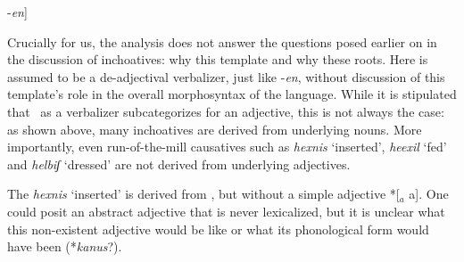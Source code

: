 \begin{exe}
\begin{xlist}
\begin{xlist}
\begin{exe}
\begin{exe}
\begin{xlist}
\begin{exe}
\begin{xlist}
\begin{exe}
\begin{xlist}
\begin{xlist}
\begin{exe}
\begin{xlist}
\begin{exe}
\begin{xlist}
\begin{exe}
\begin{exe}
\begin{exe}
\begin{xlist}
\begin{exe}
\begin{exe}
\begin{xlist}
\begin{xlist}
\begin{exe}
\begin{xlist}
\begin{exe}
\begin{exe}
\begin{exe}
\begin{xlist}
\begin{exe}
\begin{exe}
\begin{xlist}
\begin{exe}
\begin{xlist}
\begin{exe}
\begin{xlist}
\begin{exe}
\begin{xlist}
\begin{exe}
\begin{exe}
\begin{xlist}
\begin{exe}
\begin{exe}
\begin{xlist}
\begin{xlist}
\begin{exe}
\begin{xlist}
\begin{xlist}
\begin{exe}
\begin{xlist}
\begin{exe}
\begin{xlist}
\begin{exe}
\begin{xlist}
\begin{exe}
\begin{xlist}
\begin{exe}
\begin{exe}
\begin{exe}
\begin{exe}
\begin{xlist}
\begin{exe}
\begin{exe}
\begin{xlist}
\begin{xlist}
\begin{exe}
\begin{exe}
\begin{xlist}
\begin{exe}
\begin{xlist}
\begin{exe}
\begin{xlist}
\begin{exe}
\begin{xlist}
\begin{exe}
\begin{xlist}
\begin{exe}
\begin{exe}
 -\emph{en}] 
 \z 

Crucially for us, the analysis does not answer the questions posed earlier on in the discussion of inchoatives: why this template and why these roots. Here {\thif} is assumed to be a de-adjectival verbalizer, just like -\emph{en}, without discussion of this template's role in the overall morphosyntax of the language. While it is stipulated that \thif~as a verbalizer subcategorizes for an adjective, this is not always the case: as shown above, many inchoatives are derived from underlying nouns. More importantly, even run-of-the-mill causatives such as \emph{hexnis} `inserted', \emph{heexil} `fed' and \emph{helbiʃ} `dressed' are not derived from underlying adjectives.

The  \emph{hexnis} `inserted' is derived from , but without a simple adjective *[$_{a}$  a]. One could posit an abstract adjective that is never lexicalized, but it is unclear what this non-existent adjective would be like or what its phonological form would have been (*\emph{kanus}?).
 \begin{exe}
	
 \z 


\end{exe}
\end{exe}
\end{exe}
\end{xlist}
\end{exe}
\end{xlist}
\end{exe}
\end{xlist}
\end{exe}
\end{xlist}
\end{exe}
\end{xlist}
\end{exe}
\end{exe}
\end{xlist}
\end{xlist}
\end{exe}
\end{exe}
\end{xlist}
\end{exe}
\end{exe}
\end{exe}
\end{exe}
\end{xlist}
\end{exe}
\end{xlist}
\end{exe}
\end{xlist}
\end{exe}
\end{xlist}
\end{exe}
\end{xlist}
\end{xlist}
\end{exe}
\end{xlist}
\end{xlist}
\end{exe}
\end{exe}
\end{xlist}
\end{exe}
\end{exe}
\end{xlist}
\end{exe}
\end{xlist}
\end{exe}
\end{xlist}
\end{exe}
\end{xlist}
\end{exe}
\end{exe}
\end{xlist}
\end{exe}
\end{exe}
\end{exe}
\end{xlist}
\end{exe}
\end{xlist}
\end{xlist}
\end{exe}
\end{exe}
\end{xlist}
\end{exe}
\end{exe}
\end{exe}
\end{xlist}
\end{exe}
\end{xlist}
\end{exe}
\end{xlist}
\end{xlist}
\end{exe}
\end{xlist}
\end{exe}
\end{xlist}
\end{exe}
\end{exe}
\end{xlist}
\end{xlist}
\end{exe}
